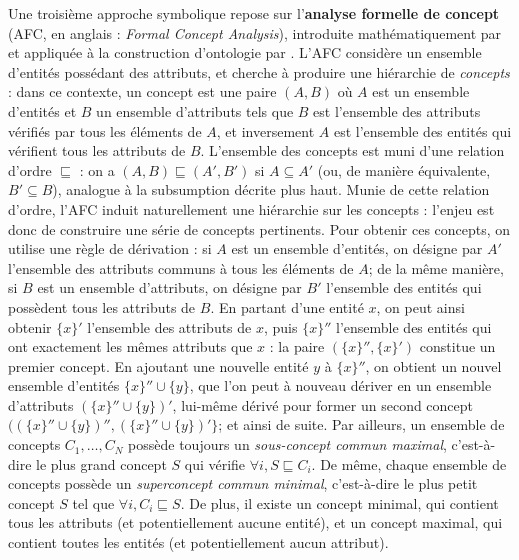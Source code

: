 Une troisième approche symbolique repose sur l'\textbf{analyse formelle de concept} (AFC, en anglais :  \textit{Formal Concept Analysis}), introduite mathématiquement par \cite{wille1982fca} et appliquée à la construction d'ontologie par \cite{cimiano2004conceptual}. L'AFC considère un ensemble d'entités possédant des attributs, et cherche à produire une hiérarchie de \textit{concepts} : dans ce contexte, un concept est une paire $(A, B)$ où $A$ est un ensemble d'entités et $B$ un ensemble d'attributs tels que $B$ est l'ensemble des attributs vérifiés par tous les éléments de $A$, et inversement $A$ est l'ensemble des entités qui vérifient tous les attributs de $B$. L'ensemble des concepts est muni d'une relation d'ordre $\sqsubseteq$ : on a $(A, B) \sqsubseteq (A', B')$ si $A \subseteq A'$ (ou, de manière équivalente, $B' \subseteq B$), analogue à la subsumption décrite plus haut. Munie de cette relation d'ordre, l'AFC induit naturellement une hiérarchie sur les concepts : l'enjeu est donc de construire une série de concepts pertinents.
Pour obtenir ces concepts, on utilise une règle de dérivation : si $A$ est un ensemble d'entités, on désigne par $A'$ l'ensemble des attributs communs à tous les éléments de $A$; de la même manière, si $B$ est un ensemble d'attributs, on désigne par $B'$ l'ensemble des entités qui possèdent tous les attributs de $B$. En partant d'une entité $x$, on peut ainsi obtenir $\{x\}'$ l'ensemble des attributs de $x$, puis $\{x\}''$ l'ensemble des entités qui ont exactement les mêmes attributs que $x$ : la paire $(\{x\}'', \{x\}' )$ constitue un premier concept. En ajoutant une nouvelle entité $y$ à $\{x\}''$, on obtient un nouvel ensemble d'entités $\{x \}'' \cup \{ y\}$, que l'on peut à nouveau dériver en un ensemble d'attributs  $(\{x \}'' \cup \{ y\})'$, lui-même dérivé pour former un second concept $((\{x \}'' \cup \{ y\})'', (\{x \}'' \cup \{ y\})'\}$; et ainsi de suite. Par ailleurs, un ensemble de concepts $C_1, \ldots, C_N$ possède toujours un \textit{sous-concept commun maximal}, c'est-à-dire le plus grand concept $S$ qui vérifie $\forall i, S \sqsubseteq C_i$. De même, chaque ensemble de concepts possède un \textit{superconcept commun minimal}, c'est-à-dire le plus petit concept $S$ tel que $\forall i, C_i \sqsubseteq S$. De plus, il existe un concept minimal, qui contient tous les attributs (et potentiellement aucune entité), et un concept maximal, qui contient toutes les entités (et potentiellement aucun attribut). 
